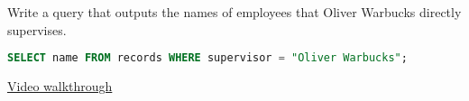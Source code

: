 \question Write a query that outputs the names of employees that Oliver
Warbucks directly supervises.
\begin{solution}[1cm]
\begin{lstlisting}[language=SQL]
SELECT name FROM records WHERE supervisor = "Oliver Warbucks";
\end{lstlisting}
\href{https://youtu.be/GBqEWJKGL2k}{Video walkthrough}
\end{solution}
